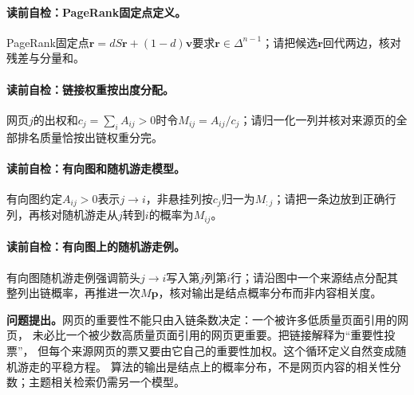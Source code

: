 \paragraph{读前自检：PageRank固定点定义。}PageRank固定点$\boldsymbol r=dS\boldsymbol r+(1-d)\boldsymbol v$要求$\boldsymbol r\in\Delta^{n-1}$；请把候选$\boldsymbol r$回代两边，核对残差与分量和。\par
\paragraph{读前自检：链接权重按出度分配。}网页$j$的出权和$c_j=\sum_iA_{ij}>0$时令$M_{ij}=A_{ij}/c_j$；请归一化一列并核对来源页的全部排名质量恰按出链权重分完。\par
\paragraph{读前自检：有向图和随机游走模型。}有向图约定$A_{ij}>0$表示$j\to i$，非悬挂列按$c_j$归一为$M_{:j}$；请把一条边放到正确行列，再核对随机游走从$j$转到$i$的概率为$M_{ij}$。\par
\paragraph{读前自检：有向图上的随机游走例。}有向图随机游走例强调箭头$j\to i$写入第$j$列第$i$行；请沿图中一个来源结点分配其整列出链概率，再推进一次$M\boldsymbol p$，核对输出是结点概率分布而非内容相关度。\par


\label{struct:V5-C07-CH06}
\textbf{问题提出。}网页的重要性不能只由入链条数决定：一个被许多低质量页面引用的网页，
未必比一个被少数高质量页面引用的网页更重要。\PageRank{}把链接解释为“重要性投票”，
但每个来源网页的票又要由它自己的重要性加权。这个循环定义自然变成随机游走的平稳方程。
算法的输出是结点上的概率分布，不是网页内容的相关性分数；主题相关检索仍需另一个模型。

